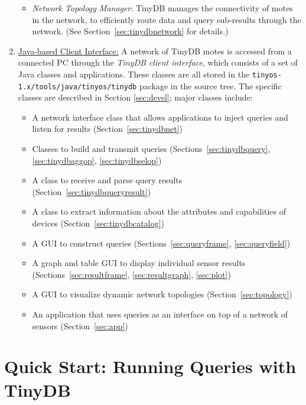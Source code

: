 \documentclass[11pt]{article}
\newcommand{\java}{tinyos-1.x/tools/java}
\begin{document}
\begin{enumerate}
\begin{itemize}
\item {\it Network Topology Manager}: TinyDB manages the connectivity
  of motes in the network, to efficiently
  route data and query 
  sub-results through the network.  (See Section~\ref{sec:tinydbnetwork}
  for details.)
\end{itemize}
\item \underline{Java-based Client Interface:}
A network of TinyDB motes is accessed from a connected PC through the
{\em TinyDB client interface}, which consists
of a set of Java classes and applications.  These classes are all stored in the {\tt {\java}/tinyos/tinydb} 
package in the source tree.  The specific classes are described in Section \ref{sec:devel};  major
classes include:
\begin{itemize}
\item A network interface class that allows applications to inject queries and listen for results (Section~\ref{sec:tinydbnet}) 
\item Classes to build and transmit queries (Sections~\ref{sec:tinydbquery}, \ref{sec:tinydbaggop}, \ref{sec:tinydbselop})
\item A class to receive and parse query results (Section~\ref{sec:tinydbqueryresult})
\item A class to extract information about the attributes and capabilities of devices (Section~\ref{sec:tinydbcatalog})
\item A GUI to construct queries (Sections~\ref{sec:queryframe}, \ref{sec:queryfield})
\item A graph and table GUI to display individual sensor results (Sections~\ref{sec:resultframe}, \ref{sec:resultgraph}, \ref{sec:plot})
\item A GUI to visualize dynamic network topologies (Section~\ref{sec:topology})
\item An application that uses queries as an interface on top of a network of sensors (Section~\ref{sec:app})
\end{itemize}
\end{enumerate}

\section{Quick Start:  Running Queries with TinyDB} \label{sec:runningqueries}
\end{document}
